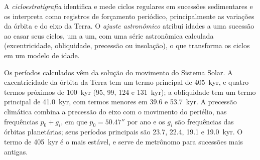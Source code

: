 \begin{definition}\label{def:b3:sequence-stratigraphy:cyclo}
A \emph{cicloestratigrafia} identifica e mede
ciclos regulares em sucessões sedimentares e os interpreta como registros de
forçamento periódico, principalmente as variações da órbita e do eixo da Terra.
O \emph{ajuste astronômico} atribui idades a uma
sucessão ao casar seus ciclos, um a um, com uma série astronômica calculada
(excentricidade, obliquidade, precessão ou insolação), o que transforma os
ciclos em um modelo de idade.
\end{definition}

Os períodos calculados vêm da solução do movimento do Sistema Solar.
A excentricidade da órbita da Terra tem um termo principal de \qty{405}{kyr}, e
quatro termos próximos de \qty{100}{kyr} (95, 99, 124 e \qty{131}{kyr}); a
obliquidade tem um termo principal de \qty{41.0}{kyr}, com termos menores em 39.6 e
\qty{53.7}{kyr}. A precessão climática combina a precessão do eixo
com o movimento do periélio, nas frequências $p_0 + g_i$, em que $p_0 =
50.47''$ por ano e os $g_i$ são frequências das órbitas planetárias; seus
períodos principais são 23.7, 22.4, 19.1 e \qty{19.0}{kyr}. O termo de \qty{405}{kyr}
é o mais estável, e serve de metrônomo para sucessões mais antigas.

